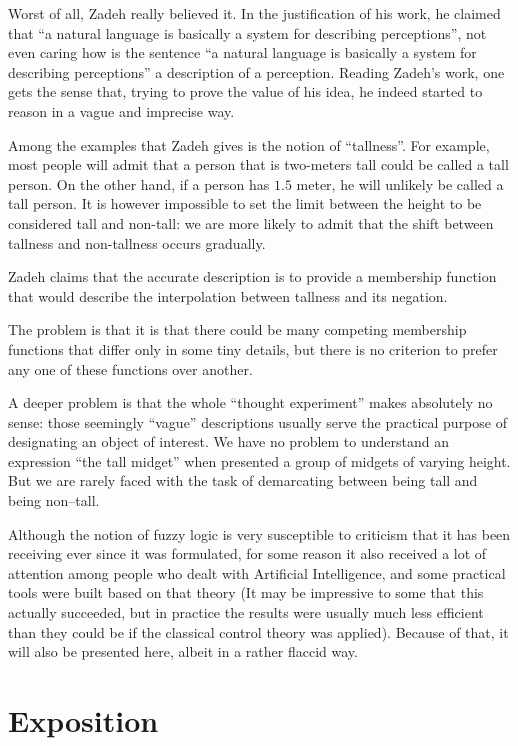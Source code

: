 Worst of all, Zadeh really believed it. In the justification
of his work, he claimed that ``a natural language is basically
a system for describing perceptions''\cite{Zadeh2008}, not
even caring how is the sentence ``a natural language is basically
a system for describing perceptions'' a description of
a perception. Reading Zadeh's work, one gets the sense that,
trying to prove the value of his idea, he indeed started to
reason in a vague and imprecise way.

Among the examples that Zadeh gives is the notion of ``tallness''.
For example, most people will admit that a person that is
two-meters tall could be called a tall person. On the other
hand, if a person has $1.5$ meter, he will unlikely be called
a tall person. It is however impossible to set the limit between
the height to be considered tall and non-tall: we are more
likely to admit that the shift between tallness and non-tallness
occurs gradually.

Zadeh claims that the accurate description is to provide
a membership function that would describe the interpolation
between tallness and its negation.

The problem is that it is that there could be many competing
membership functions that differ only in some tiny details,
but there is no criterion to prefer any one of these functions
over another.

A deeper problem is that the whole ``thought experiment''
makes absolutely no sense: those seemingly ``vague''
descriptions usually serve the practical purpose
of designating an object of interest. We have no problem
to understand an expression ``the tall midget'' when
presented a group of midgets of varying height. But we
are rarely faced with the task of demarcating between
being tall and being non--tall.

Although the notion of fuzzy logic is very susceptible to
criticism that it has been receiving ever since it was
formulated, for some reason it also received a lot of attention
among people who dealt with Artificial Intelligence, and
some practical tools were built based on that theory
(It may be impressive to some that this actually succeeded,
but in practice the results were usually much less
efficient than they could be if the classical control
theory was applied).
Because of that, it will also be presented here, albeit
in a rather flaccid way.

\section{Exposition}

